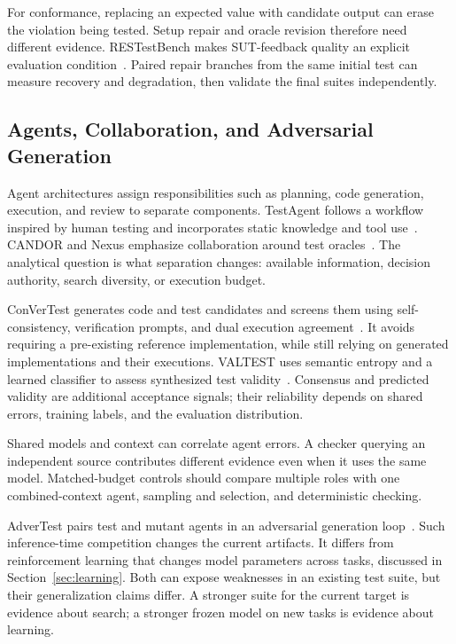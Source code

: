 For conformance, replacing an expected value with candidate output can erase the violation being tested. Setup repair and oracle revision therefore need different evidence. RESTestBench makes SUT-feedback quality an explicit evaluation condition~\cite{B05}. Paired repair branches from the same initial test can measure recovery and degradation, then validate the final suites independently.

\subsection{Agents, Collaboration, and Adversarial Generation}
Agent architectures assign responsibilities such as planning, code generation, execution, and review to separate components. TestAgent follows a workflow inspired by human testing and incorporates static knowledge and tool use~\cite{U09}. CANDOR and Nexus emphasize collaboration around test oracles~\cite{O06,O03}. The analytical question is what separation changes: available information, decision authority, search diversity, or execution budget.

ConVerTest generates code and test candidates and screens them using self-consistency, verification prompts, and dual execution agreement~\cite{O10}. It avoids requiring a pre-existing reference implementation, while still relying on generated implementations and their executions. VALTEST uses semantic entropy and a learned classifier to assess synthesized test validity~\cite{O11}. Consensus and predicted validity are additional acceptance signals; their reliability depends on shared errors, training labels, and the evaluation distribution.

Shared models and context can correlate agent errors. A checker querying an independent source contributes different evidence even when it uses the same model. Matched-budget controls should compare multiple roles with one combined-context agent, sampling and selection, and deterministic checking.

AdverTest pairs test and mutant agents in an adversarial generation loop~\cite{U10}. Such inference-time competition changes the current artifacts. It differs from reinforcement learning that changes model parameters across tasks, discussed in Section~\ref{sec:learning}. Both can expose weaknesses in an existing test suite, but their generalization claims differ. A stronger suite for the current target is evidence about search; a stronger frozen model on new tasks is evidence about learning.

